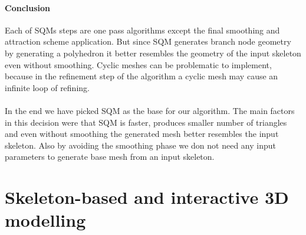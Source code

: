 \paragraph{Conclusion}
Each of SQMs steps are one pass algorithms except the final smoothing and attraction scheme application. But since SQM generates branch node geometry by generating a polyhedron it better resembles the geometry of the input skeleton even without smoothing. Cyclic meshes can be problematic to implement, because in the refinement step of the algorithm a cyclic mesh may cause an infinite loop of refining.

\paragraph{}
In the end we have picked SQM as the base for our algorithm. The main factors in this decision were that SQM is faster, produces smaller number of triangles and even without smoothing the generated mesh better resembles the input skeleton. Also by avoiding the smoothing phase we don not need any input parameters to generate base mesh from an input skeleton.

\section{Skeleton-based and interactive 3D modelling} 